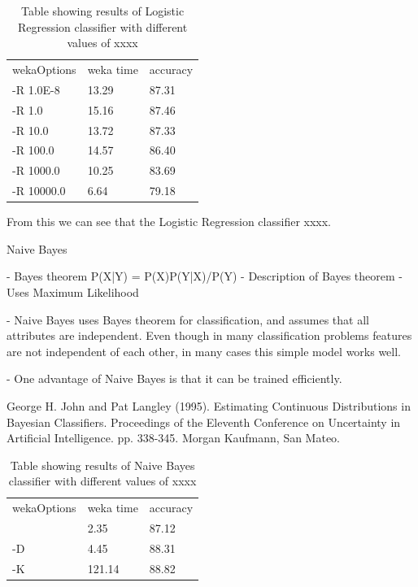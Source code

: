 \documentclass[12pt,oneside]{book}
\begin{document}
\begin{table}
\begin{tabular}{|l|l|l|}
\hline

wekaOptions          & weka time       &accuracy        \\
-R 1.0E-8            & 13.29           & 87.31           \\
-R 1.0               & 15.16           & 87.46           \\
-R 10.0              & 13.72           & 87.33           \\
-R 100.0             & 14.57           & 86.40           \\
-R 1000.0            & 10.25           & 83.69           \\
-R 10000.0           & 6.64            & 79.18           \\

\hline
\end{tabular}
\caption{Table showing results of Logistic Regression classifier with
  different values of xxxx}
\label{table:obv-10-logistic}
\end{table}

From this we can see that the Logistic Regression classifier xxxx.


%
%
Naive Bayes

- Bayes theorem P(X|Y) = P(X)P(Y|X)/P(Y)
- Description of Bayes theorem
- Uses Maximum Likelihood

- Naive Bayes uses Bayes theorem for classification, and assumes that
all attributes are independent.  Even though in many classification problems
features are not independent of each other, in many cases this simple model works well.

- One advantage of Naive Bayes is that it can be trained efficiently.

George H. John and Pat Langley (1995). Estimating Continuous
Distributions in Bayesian Classifiers. Proceedings of the Eleventh
Conference on Uncertainty in Artificial
Intelligence. pp. 338-345. Morgan Kaufmann, San Mateo.


\begin{table}
\begin{tabular}{|l|l|l|}
\hline

wekaOptions          & weka time       &accuracy        \\
                     & 2.35            & 87.12           \\
-D                   & 4.45            & 88.31           \\
-K                   & 121.14          & 88.82           \\


\hline
\end{tabular}
\caption{Table showing results of Naive Bayes classifier with
  different values of xxxx}
\label{table:obv-11-naiveBayes}
\end{table}
\end{document}
